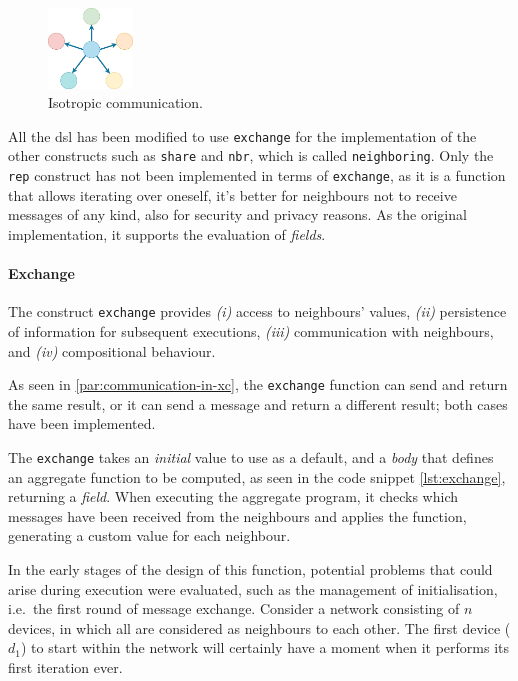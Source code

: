 \begin{figure}[h!]
    \centering
    \includegraphics[width=0.2\textwidth]{figures/isotropic}
    \caption{Isotropic communication.}
    \label{fig:isotropic}
\end{figure}

All the \ac{dsl} has been modified to use \texttt{exchange} for the implementation of the other constructs such as \texttt{share}
and \texttt{nbr}, which is called \texttt{neighboring}.
Only the \texttt{rep} construct has not been implemented in terms of \texttt{exchange}, as it is a function that allows iterating
over oneself, it's better for neighbours not to receive messages of any kind, also for security and privacy reasons.
As the original implementation, it supports the evaluation of \emph{fields}.

\paragraph{Exchange}
The construct \texttt{exchange} provides
    \emph{(i)} access to neighbours' values,
    \emph{(ii)} persistence of information for subsequent executions,
    \emph{(iii)} communication with neighbours, and
    \emph{(iv)} compositional behaviour.

As seen in \ref{par:communication-in-xc}, the \texttt{exchange} function can send and return the same result, or it
can send a message and return a different result; both cases have been implemented.


The \texttt{exchange} takes an \emph{initial} value to use as a default, and a \emph{body} that defines an aggregate
function to be computed, as seen in the code snippet \ref{lst:exchange}, returning a \emph{field}.
When executing the aggregate program, it checks which messages have been received from the neighbours and applies the function,
generating a custom value for each neighbour.

In the early stages of the design of this function, potential problems that could arise during execution were evaluated,
such as the management of initialisation, i.e.\ the first round of message exchange.
Consider a network consisting of $n$ devices, in which all are considered as neighbours to each other.
The first device ($d_1$) to start within the network will certainly have a moment when it performs its first iteration ever.

